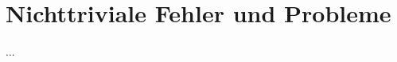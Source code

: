 \documentclass[../implementierung.tex]{subfiles}
\begin{document}
\section{Nichttriviale Fehler und Probleme}
...
\end{document}
